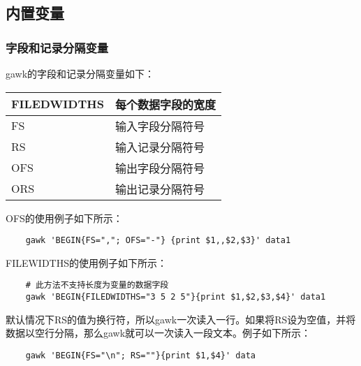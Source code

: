 \documentclass[a4paper,left=2.5cm,right=2.5cm,11pt]{article}
\begin{document}
\subsection{内置变量}
\subsubsection{字段和记录分隔变量}
	gawk的字段和记录分隔变量如下：
	\begin{longtable}{p{3cm}p{6cm}}
	\hline
	FILEDWIDTHS & 每个数据字段的宽度 \\
	\hline
	FS & 输入字段分隔符号 \\
	\hline
	RS & 输入记录分隔符号 \\
	\hline
	OFS & 输出字段分隔符号 \\
	\hline
	ORS & 输出记录分隔符号 \\
	\hline
	\end{longtable}

	OFS的使用例子如下所示：
	\begin{lstlisting}
	gawk 'BEGIN{FS=","; OFS="-"} {print $1,,$2,$3}' data1
	\end{lstlisting}

	FILEWIDTHS的使用例子如下所示：
	\begin{lstlisting}
	# 此方法不支持长度为变量的数据字段
	gawk 'BEGIN{FILEDWIDTHS="3 5 2 5"}{print $1,$2,$3,$4}' data1
	\end{lstlisting}

	默认情况下RS的值为换行符，所以gawk一次读入一行。如果将RS设为空值，并将数据以空行分隔，那么gawk就可以一次读入一段文本。例子如下所示：
	\begin{lstlisting}
	gawk 'BEGIN{FS="\n"; RS=""}{print $1,$4}' data
	\end{lstlisting}
\end{document}
